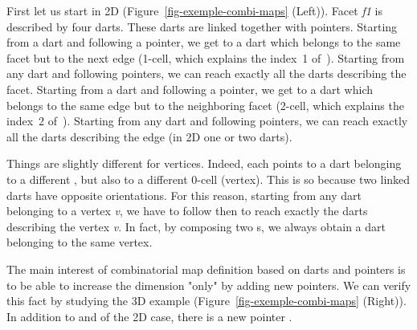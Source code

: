 First let us start in 2D (Figure~\ref{fig-exemple-combi-maps} (Left)).
Facet \emph{f1} is described by four darts. These darts are linked
together with pointers. Starting from a dart and following a \betaun{} %
pointer, we get to a dart which belongs to the same facet but to the
next edge (1-cell, which explains the index~1 of~\betaun{}).
Starting from any dart and following \betaun{} pointers, we can reach
exactly all the darts describing the facet.  Starting from a dart and
following a \betadeux{} pointer, we get to a dart which belongs to the
same edge but to the neighboring facet (2-cell, which explains the
index~2 of~\betadeux{}).  Starting from any dart and following
\betadeux{} pointers, we can reach exactly all the darts describing the
edge (in 2D one or two darts).

Things are slightly different for vertices.  Indeed, each \betai{}
points to a dart belonging to a different , but also to a
different 0-cell (vertex).  This is so because two linked darts have
opposite orientations.  For this reason, starting from any dart
belonging to a vertex \emph{v}, we have to follow \betadeux{} then \betaun{}
to reach exactly the darts describing the vertex \emph{v}.  In fact, by
composing two \betai{}s, we always obtain a dart belonging to the
same vertex.

The main interest of combinatorial map definition based on darts and
\betai{} pointers is to be able to increase the dimension "only" by
adding new pointers. We can verify this fact by studying the 3D
example (Figure~\ref{fig-exemple-combi-maps} (Right)). In addition to
\betaun{} and \betadeux{} of the 2D case, there is a new pointer
\betatrois{}.


